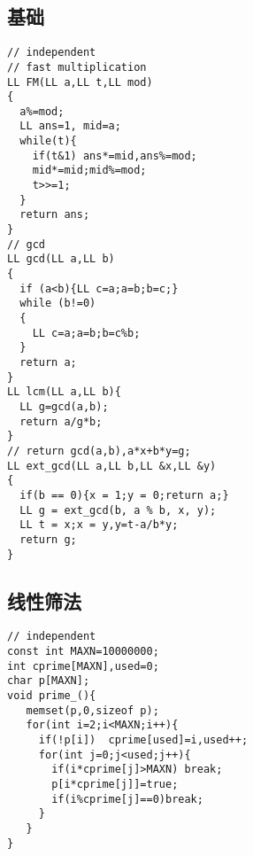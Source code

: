 \subsection{基础}
\begin{lstlisting}[language={}]
// independent 
// fast multiplication
LL FM(LL a,LL t,LL mod)
{
  a%=mod;
  LL ans=1, mid=a;
  while(t){
    if(t&1) ans*=mid,ans%=mod;
    mid*=mid;mid%=mod;
    t>>=1;  
  } 
  return ans;
}
// gcd
LL gcd(LL a,LL b)
{
  if (a<b){LL c=a;a=b;b=c;}
  while (b!=0)
  {
    LL c=a;a=b;b=c%b;
  }
  return a;
}
LL lcm(LL a,LL b){
  LL g=gcd(a,b);
  return a/g*b; 
}
// return gcd(a,b),a*x+b*y=g;
LL ext_gcd(LL a,LL b,LL &x,LL &y)
{
  if(b == 0){x = 1;y = 0;return a;}
  LL g = ext_gcd(b, a % b, x, y);
  LL t = x;x = y,y=t-a/b*y;
  return g;
}
\end{lstlisting}
\subsection{线性筛法}
\begin{lstlisting}[language={}]
// independent 
const int MAXN=10000000;
int cprime[MAXN],used=0;
char p[MAXN]; 
void prime_(){
   memset(p,0,sizeof p);
   for(int i=2;i<MAXN;i++){
     if(!p[i])  cprime[used]=i,used++;
     for(int j=0;j<used;j++){
       if(i*cprime[j]>MAXN) break;
       p[i*cprime[j]]=true;
       if(i%cprime[j]==0)break;   
     }    
   }
}
\end{lstlisting}
